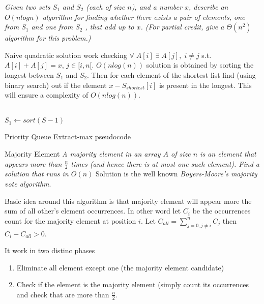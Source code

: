 \begin{problem}
\textit{Given two sets $S_1$ and $S_2$ (each of size $n$), and a number $x$, describe an $O(n log n)$
algorithm for finding whether there exists a pair of elements, one from $S_1$ and one
from $S_2$ , that add up to $x$. (For partial credit, give a $\Theta(n^2 )$ algorithm for this
problem.)}

\begin{solution}
Naive quadratic solution work checking $\forall \;A[i] \; \exists \; A[j],\; i \neq j$ s.t. $A[i]+A[j] =x$, $j \in [i,n[$.
$O(nlog(n))$ solution is obtained by sorting the longest between $S_1$ and $S_2$. Then for each element of the shortest list find (using binary search) out if the element $x-S_{shortest}[i]$ is present in the longest. This will ensure a complexity of $O(nlog(n))$.
\hfill \\ \hfill \\
\begin{algorithm}[H]
 $S_1 \gets sort(S-1)$\;
\;
\caption{Priority Queue Extract-max pseudocode}
\end{algorithm}



\end{solution}
\end{problem}


\begin{problem}{Majority Element}
\textit{A majority element in an array $A$ of size $n$ is an element that appears more than $\frac{n}{2}$ times (and hence there is at most one such element). Find a solution that runs in $O(n)$}
Solution is the well known \textit{Boyers-Moore's majority vote algorithm}.
\begin{solution}
Basic idea around this algorithm is that majority element will appear more the sum of all other's element occurrences. In other word let $C_i$ be the  occurrences count 
for the majority element at position $i$. Let $C_{all} = \sum_{j=0,j\neq i}^n C_j$ then $ C_i - C_{all} > 0$.

It work in two distinc phases

\begin{enumerate}
\item Eliminate all element except one (the majority element candidate)
\item Check if the element is the majority element (simply count its occurrences and check that are more than $\frac{n}{2}$.

\end{enumerate}


\end{solution}
\end{problem}

